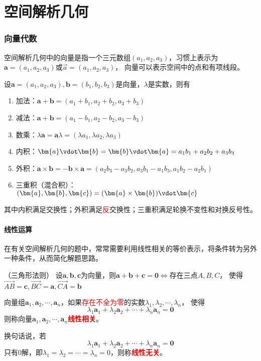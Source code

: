\part{空间解析几何}
\section{向量代数}
空间解析几何中的向量是指一个三元数组$(a_1,a_2,a_3)$，习惯上表示为$\bm{a}=(a_1,a_2,a_3 )$或$\vec{a}=(a_1,a_2,a_3)$，
向量可以表示空间中的点和有项线段。

\begin{definition}
    设$\bm{a} = (a_1,a_2,a_3),\bm{b} = (b_1,b_2,b_3)$是向量，$\lambda$是实数，则有
    \begin{enumerate}[(1)]
        \item 加法：$\bm{a}+\bm{b} = (a_1+b_1,a_2+b_2,a_3+b_3)$
        \item 减法：$\bm{a}+\bm{b} = (a_1-b_1,a_2-b_2,a_3-b_3)$
        \item 数乘：$\lambda\bm{a} = \bm{a}\lambda = (\lambda a_1, \lambda a_2, \lambda a_3)$
        \item 内积：$\bm{a}\vdot\bm{b} = \bm{b}\vdot\bm{a} = a_1b_1+a_2b_2+a_3b_3$
        \item 外积：$\bm{a}\times\bm{b} = -\bm{b}\times\bm{a} = (a_2b_3-a_3b_2, a_3b_1-a_1b_3, a_1b_2-a_2b_1)$
        \item 三重积（混合积）：$(\bm{a},\bm{b},\bm{c}) = (\bm{a}\times\bm{b})\vdot\bm{c}$
    \end{enumerate}
\end{definition}
其中内积满足交换性；外积满足\textcolor{red}{反}交换性；三重积满足轮换不变性和对换反号性。
\subsection{线性运算}
在有关空间解析几何的题中，常常需要利用线性相关的等价表示，将条件转为另外一种条件，从而简化解题思路。
\begin{theorem}
    （三角形法则）
    \label{th:三角形法则}
    设$\bm{a},\bm{b},\bm{c}$为向量，则$\bm{a}+\bm{b}+\bm{c}=\bm{0}\iff$存在三点$A,B,C$，
    使得$\overrightarrow{AB}=\bm{c},\overrightarrow{BC}=\bm{a},\overrightarrow{CA}=\bm{b}$
\end{theorem}

\begin{definition}
    向量组$\bm{a}_1,\bm{a}_2,\cdots,\bm{a}_n$，如果\textcolor{red}{存在不全为零}的实数$\lambda_1,\lambda_2,\cdots,\lambda_n$，
    使得
    \[ \lambda_1\bm{a}_1 + \lambda_2\bm{a}_2 + \cdots + \lambda_n\bm{a}_n = \bm{0} \]
    则称向量$\bm{a}_1,\bm{a}_2,\cdots,\bm{a}_n$\textcolor{red}{\textbf{\textsf{线性相关}}}。

    换句话说，若
    \[ \lambda_1\bm{a}_1 + \lambda_2\bm{a}_2 + \cdots + \lambda_n\bm{a}_n = \bm{0} \]
    只有$0$解，即$\lambda_1 = \lambda_2 = \cdots = \lambda_n = 0$，则称\textcolor{red}{\textbf{\textsf{线性无关}}}。
\end{definition}

